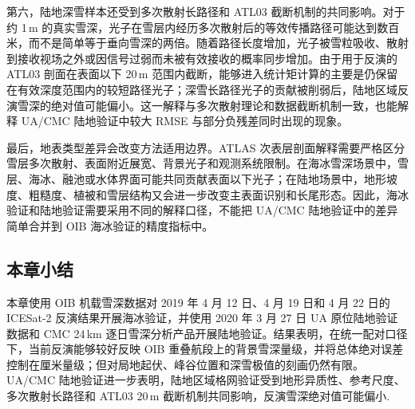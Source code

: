 第六，陆地深雪样本还受到多次散射长路径和 ATL03 截断机制的共同影响。对于约 1\,m 的真实雪深，光子在雪层内经历多次散射后的等效传播路径可能达到数百米，而不是简单等于垂向雪深的两倍。随着路径长度增加，光子被雪粒吸收、散射到接收视场之外或因信号过弱而未被有效接收的概率同步增加。由于用于反演的 ATL03 剖面在表面以下 20\,m 范围内截断，能够进入统计矩计算的主要是仍保留在有效深度范围内的较短路径光子；深雪长路径光子的贡献被削弱后，陆地区域反演雪深的绝对值可能偏小。这一解释与多次散射理论和数据截断机制一致，也能解释 UA/CMC 陆地验证中较大 RMSE 与部分负残差同时出现的现象。

最后，地表类型差异会改变方法适用边界。ATLAS 次表层剖面解释需要严格区分雪层多次散射、表面附近展宽、背景光子和观测系统限制。在海冰雪深场景中，雪层、海冰、融池或水体界面可能共同贡献表面以下光子；在陆地场景中，地形坡度、粗糙度、植被和雪层结构又会进一步改变主表面识别和长尾形态。因此，海冰验证和陆地验证需要采用不同的解释口径，不能把 UA/CMC 陆地验证中的差异简单合并到 OIB 海冰验证的精度指标中。

\subsection{本章小结}
本章使用 OIB 机载雪深数据对 2019 年 4 月 12 日、4 月 19 日和 4 月 22 日的 ICESat-2 反演结果开展海冰验证，并使用 2020 年 3 月 27 日 UA 原位陆地验证数据和 CMC 24\,km 逐日雪深分析产品开展陆地验证。结果表明，在统一配对口径下，当前反演能够较好反映 OIB 重叠航段上的背景雪深量级，并将总体绝对误差控制在厘米量级；但对局地起伏、峰谷位置和深雪极值的刻画仍然有限。UA/CMC 陆地验证进一步表明，陆地区域格网验证受到地形异质性、参考尺度、多次散射长路径和 ATL03 20\,m 截断机制共同影响，反演雪深绝对值可能偏小.
